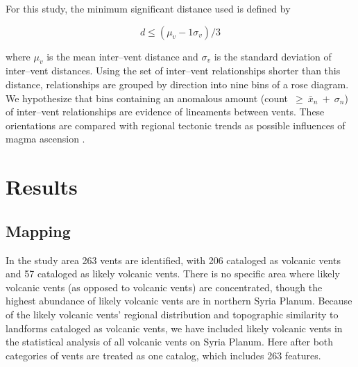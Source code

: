 For this study, the minimum significant distance used is defined by \citet{Cebria2011} \begin{linenomath*}\begin{equation}
d \le (\mu_v - 1\sigma_v) / 3 \label{eq5}
\end{equation}\end{linenomath*} where $\mu_v$ is the mean inter--vent distance and $\sigma_v$ is the standard deviation of inter--vent distances. Using the set of inter--vent relationships shorter than this distance, relationships are grouped by direction into nine bins of a rose diagram. We hypothesize that bins containing an anomalous amount (count~$\ge~\bar{x}_n~+~\sigma_n$) of inter--vent relationships are evidence of lineaments between vents. These orientations are compared with regional tectonic trends as possible influences of magma ascension \citep{Bleacher2009,Cebria2011}.

\section{Results}

\subsection{Mapping}

In the study area 263 vents are identified, with 206 cataloged as volcanic vents and 57 cataloged as likely volcanic vents. There is no specific area where likely volcanic vents (as opposed to volcanic vents) are concentrated, though the highest abundance of likely volcanic vents are in northern Syria Planum. Because of the likely volcanic vents' regional distribution and topographic similarity to landforms cataloged as volcanic vents, we have included likely volcanic vents in the statistical analysis of all volcanic vents on Syria Planum. Here after both categories of vents are treated as one catalog, which includes 263 features.

